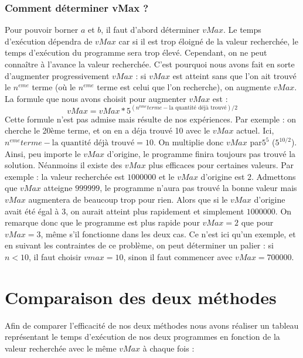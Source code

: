 \documentclass{article}
\begin{document}
\section{Comment déterminer vMax ?}

Pour pouvoir borner $a$ et $b$, il faut d'abord déterminer $vMax$. Le temps d'exécution dépendra de $vMax$ car si il est trop éloigné de la valeur recherchée, le temps d'exécution du programme sera trop élevé. Cependant, on ne peut connaître à l'avance la valeur recherchée. C'est pourquoi nous avons fait en sorte d'augmenter progressivement $vMax$ : si $vMax$ est atteint sans que l'on ait trouvé le $n^{eme}$ terme (où le $n^{eme}$ terme est celui que l'on recherche), on augmente $vMax$. La formule que nous avons choisit pour augmenter $vMax$ est : \[vMax = vMax * 5^{(n^{ème} terme - \text{la quantité déjà trouvé})/2}\] Cette formule n'est pas admise mais résulte de nos expériences. Par exemple : on cherche le 20ème terme, et on en a déja trouvé 10 avec le $vMax$ actuel. Ici, $n^{eme} terme - \text{la quantité déjà trouvé} = 10$. On multiplie donc $vMax$ par$5^{5}$ ($5^{10/2}$). Ainsi, peu importe le $vMax$ d'origine, le programme finira toujours pas trouvé la solution. Néanmoins il existe des $vMax$ plus efficaces pour certaines valeurs. Par exemple : la valeur recherchée est $1 000 000$ et le $vMax$ d'origine est $2$. Admettons que $vMax$ atteigne $999 999$, le programme n'aura pas trouvé la bonne valeur mais $vMax$ augmentera de beaucoup trop pour rien. Alors que si le $vMax$ d'origine avait été égal à $3$, on aurait atteint plus rapidement et simplement $1 000 000$. On remarque donc que le programme est plus rapide pour $vMax = 2$ que pour $vMax = 3$, même s'il fonctionne dans les deux cas. Ce n'est ici qu'un exemple, et en suivant les contraintes de ce problème, on peut déterminer un palier : si $n < 10$, il faut choisir $vmax = 10$, sinon il faut commencer avec $vMax = 700 000$.

\part{Comparaison des deux méthodes}
Afin de comparer l'efficacité de nos deux méthodes nous avons réaliser un tableau représentant le temps d'exécution de nos deux programmes en fonction de la valeur recherchée avec le même $vMax$ à chaque fois :
\end{document}
